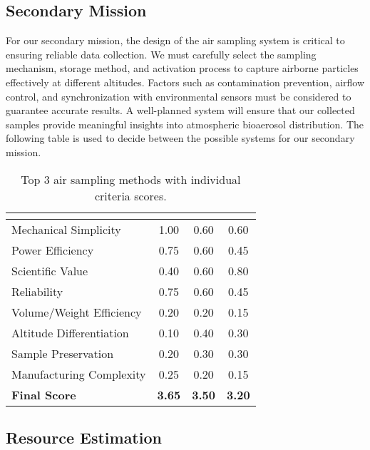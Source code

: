 \subsection{Secondary Mission}
For our secondary mission, the design of the air sampling system is critical to ensuring reliable data collection. We must carefully select the sampling mechanism, storage method, and activation process to capture airborne particles effectively at different altitudes. Factors such as contamination prevention, airflow control, and synchronization with environmental sensors must be considered to guarantee accurate results. A well-planned system will ensure that our collected samples provide meaningful insights into atmospheric bioaerosol distribution. The following table is used to decide between the possible systems for our secondary mission.


\begin{table}[htbp]
\centering
{}
\begin{tabular}{l c c c}
\rowcolor{DeepSkyBlue4}
\hline
\multicolumn{1}{|c|}{\textbf{\color{white!50}{Criteria}}} & \textbf{\color{white!50}{Passive (sCANSATi)}} & \textbf{\color{white!50}{Filter-Based Sequential}} & \textbf{\color{white!50}{Impaction Collection}} \\
\hline
Mechanical Simplicity & 1.00 & 0.60 & 0.60 \\
\rowcolor{CDOSRSecondary!50}Power Efficiency & 0.75 & 0.60 & 0.45 \\
Scientific Value & 0.40 & 0.60 & 0.80 \\
\rowcolor{CDOSRSecondary!50}Reliability & 0.75 & 0.60 & 0.45 \\
Volume/Weight Efficiency & 0.20 & 0.20 & 0.15 \\
\rowcolor{CDOSRSecondary!50}Altitude Differentiation & 0.10 & 0.40 & 0.30 \\
Sample Preservation & 0.20 & 0.30 & 0.30 \\
\rowcolor{CDOSRSecondary!50}Manufacturing Complexity & 0.25 & 0.20 & 0.15 \\
\hline
\textbf{Final Score} & \textbf{3.65} & \textbf{3.50} & \textbf{3.20} \\
\hline
\end{tabular}
\caption{Top 3 air sampling methods with individual criteria scores.}
\label{tab:top_methods_details}
\end{table}




\subsection{Resource Estimation}

